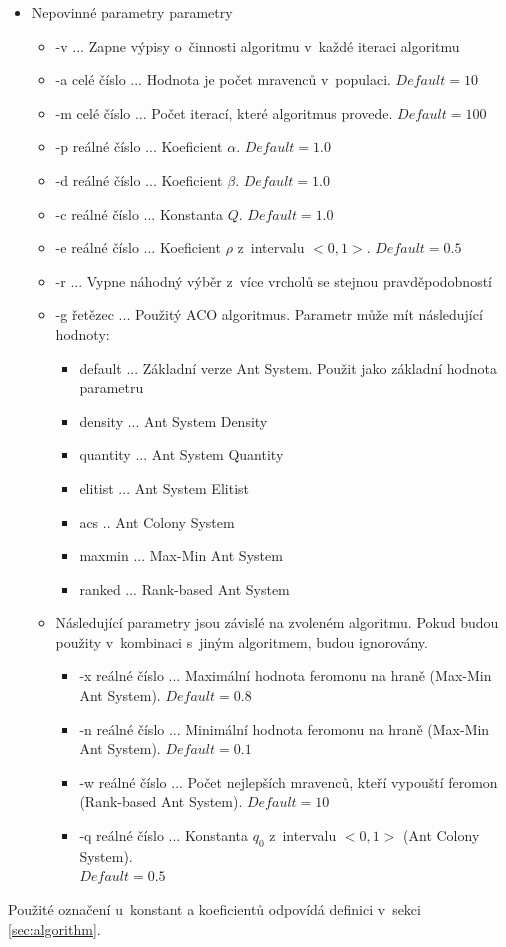 \documentclass[a4paper, 12pt]{article}
\newcommand{\defVal}[1]{$Default=#1$}
\begin{document}
  \begin{itemize}
    \item Nepovinné parametry parametry
    \begin{itemize}
      \item -v ... Zapne výpisy o~činnosti algoritmu v~každé iteraci algoritmu
      \item -a celé číslo ... Hodnota je počet mravenců v~populaci. \defVal{10}
      \item -m celé číslo ... Počet iterací, které algoritmus provede. \defVal{100}
      \item -p reálné číslo ...  Koeficient $\alpha$. \defVal{1.0}
      \item -d reálné číslo ... Koeficient $\beta$. \defVal{1.0}
      \item -c reálné číslo ... Konstanta $Q$. \defVal{1.0}
      \item -e reálné číslo ... Koeficient $\rho$ z~intervalu $<0,1>$. \defVal{0.5}
      \item -r ... Vypne náhodný výběr z~více vrcholů se stejnou pravděpodobností
      \item -g řetězec ... Použitý ACO algoritmus. Parametr může mít následující hodnoty:
      \begin{itemize}
       \item default ... Základní verze Ant System. Použit jako základní hodnota parametru
       \item density ... Ant System Density
       \item quantity ... Ant System Quantity
       \item elitist ... Ant System Elitist
       \item acs .. Ant Colony System
       \item maxmin ... Max-Min Ant System
       \item ranked ... Rank-based Ant System
      \end{itemize}
      \item Následující parametry jsou závislé na zvoleném algoritmu. Pokud budou použity v~kombinaci s~jiným algoritmem, budou ignorovány.
      \begin{itemize}
        \item -x reálné číslo ... Maximální hodnota feromonu na hraně (Max-Min Ant System). \defVal{0.8}
        \item -n reálné číslo ... Minimální hodnota feromonu na hraně (Max-Min Ant System). \defVal{0.1}
        \item -w reálné číslo ... Počet nejlepších mravenců, kteří vypouští feromon (Rank-based Ant System). \defVal{10}
        \item -q reálné číslo ... Konstanta $q_0$ z~intervalu $<0,1>$ (Ant Colony System).\\\defVal{0.5}
      \end{itemize}
    \end{itemize}
  \end{itemize}
Použité označení u~konstant a koeficientů odpovídá definici v~sekci \ref{sec:algorithm}.
\end{document}
